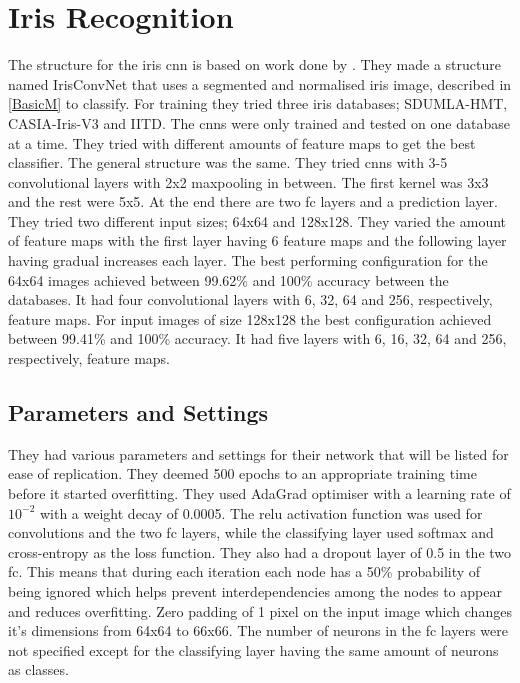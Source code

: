 \section{Iris Recognition}
The structure for the iris \gls{cnn} is based on work done by \cite{Al-Waisy2017}. They made a structure named IrisConvNet that uses a segmented and normalised iris image, described in \autoref{BasicM} to classify. For training they tried three iris databases; SDUMLA-HMT, CASIA-Iris-V3 and IITD. The \gls{cnn}s were only trained and tested on one database at a time.  They tried with different amounts of feature maps to get the best classifier. The general structure was the same. They tried \gls{cnn}s with 3-5 convolutional layers with 2x2 maxpooling in between. The first kernel was 3x3 and the rest were 5x5. At the end there are two \gls{fc} layers and a prediction layer. They tried two different input sizes; 64x64 and 128x128. They varied the amount of feature maps with the first layer having 6 feature maps and the following layer having gradual increases each layer. The best performing configuration for the 64x64 images achieved between 99.62\% and 100\% accuracy between the databases. It had four convolutional layers with 6, 32, 64 and 256, respectively, feature maps. For input images of size 128x128 the best configuration achieved between 99.41\% and 100\% accuracy. It had five layers with 6, 16, 32, 64 and 256, respectively, feature maps.

\subsection{Parameters and Settings}
They had various parameters and settings for their network that will be listed for ease of replication. They deemed 500 epochs to an appropriate training time before it started overfitting. They used AdaGrad optimiser with a learning rate of $10^{-2}$ with a weight decay of 0.0005. The \gls{relu} activation function was used for convolutions and the two \gls{fc} layers, while the classifying layer used softmax and cross-entropy as the loss function. They also had a dropout layer of 0.5 in the two \gls{fc}. This means that during each iteration each node has a 50\% probability of being ignored which helps prevent interdependencies among the nodes to appear and reduces overfitting. Zero padding of 1 pixel on the input image which changes it's dimensions from 64x64 to 66x66. The number of neurons in the \gls{fc} layers were not specified except for the classifying layer having the same amount of neurons as classes. 

